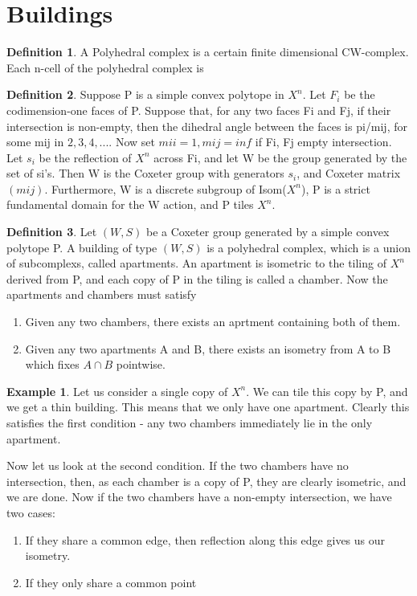 \documentclass[12pt]{article}
\begin{document}
\newtheorem{theorem}{Theorem}
\theoremstyle{definition}
\newtheorem{definition}{Definition}
\newtheorem{example}{Example}
\newtheorem{lemma}{Lemma}
\newcommand{\uw}{\mathcal{U}(W,X)}
\tableofcontents
\section{Buildings}
\begin{definition}
  A Polyhedral complex is a certain finite dimensional CW-complex. Each n-cell of the polyhedral complex is   
\end{definition}

\begin{definition}
    Suppose P is a simple convex polytope in $X^n$. Let $F_i$ be the codimension-one faces of P. Suppose that, for any two faces Fi and Fj, if their intersection is non-empty, then the dihedral angle between the faces is pi/mij, for some mij in ${2,3,4,...}$. Now set $mii=1, mij=inf$ if Fi, Fj empty intersection. Let $s_i$ be the reflection of $X^n$ across Fi, and let W be the group generated by the set of si's. Then W is the Coxeter group with generators $s_i$, and Coxeter matrix $(mij)$. Furthermore, W is a discrete subgroup of Isom($X^n$), P is a strict fundamental domain for the W action, and P tiles $X^n$. 
\end{definition}   
    
\begin{definition}
    Let $(W,S)$ be a Coxeter group generated by a simple convex polytope P. A building of type $(W,S)$ is a polyhedral complex, which is a union of subcomplexs, called apartments. An apartment is isometric to the tiling of $X^n$ derived from P, and each copy of P in the tiling is called a chamber. Now the apartments and chambers must satisfy
    \begin{enumerate}
    \item Given any two chambers, there exists an aprtment containing both of them.
    \item Given any two apartments A and B, there exists an isometry from A to B which fixes $A \cap B$ pointwise. 
    \end{enumerate}
\end{definition}

\begin{example}
    Let us consider a single copy of $X^n$. We can tile this copy by P, and we get a thin building. This means that we only have one apartment. Clearly this satisfies the first condition - any two chambers immediately lie in the only apartment. 

    Now let us look at the second condition. If the two chambers have no intersection, then, as each chamber is a copy of P, they are clearly isometric, and we are done. Now if the two chambers have a non-empty intersection, we have two cases:
    \begin{enumerate}
        \item If they share a common edge, then reflection along this edge gives us our isometry.
        \item If they only share a common point
    \end{enumerate}
\end{example}
\end{document}
